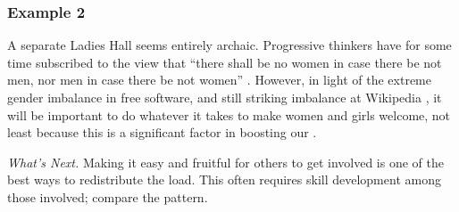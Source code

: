 \subsubsection*{Example 2}
A separate Ladies Hall seems entirely archaic.  Progressive thinkers have for
some time subscribed to the view that ``there shall be no women in
case there be not men, nor men in case there be not women''
\cite[Chapter 1.LII]{rabelais1894gargantua}.  However, in light of the
extreme gender imbalance in free software, and still striking
imbalance at Wikipedia \cite{gender,FM4291}, it will be important to
do whatever it takes to make women and girls welcome, not least
because this is a significant factor in boosting our
.


\begin{framed}
\noindent 
\emph{What's Next.}  Making it easy and fruitful for others to get involved is one of the best ways to redistribute the load.  This often requires skill development among those involved; compare the  pattern.
\end{framed}



  
